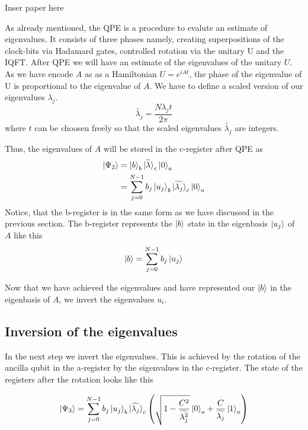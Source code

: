 Inser paper here

As already mentioned, the QPE is a procedure to evalute an estimate of eigenvalues. 
It consists of three phases namely, creating superpositions of the clock-bits via Hadamard gates, controlled rotation via the unitary U and the IQFT.
After QPE we will have an estimate of the eigenvalues of the unitary $U$. 
As we have encode $A$ as as a Hamiltonian $U = e^{iAt}$, the phase of the eigenvalue of U is proportional to the eigenvalue of $A$.
We have to define a scaled version of our eigenvalues $\lambda_j$.
\begin{equation}
\widetilde{\lambda_j} = \frac {N\lambda_jt}{2\pi}
\end{equation}
where $t$ can be choosen freely so that the scaled eigenvalues $\widetilde{\lambda_j}$ are integers.

Thus, the eigenvalues of $A$ will be stored in the c-register after QPE as
\begin{equation}
\begin{split}
\ket{\Psi_2} &= \ket{b}_b \ket{\widetilde{\lambda}}_c\ket{0}_a \\
& =\sum_{j=0}^{N-1} b_j \ket{u_j}_b \ket{\widetilde{\lambda_j}}_c \ket 0_a
\end{split}
\end{equation}
Notice, that the b-register is in the same form as we have discussed in the previous section. 
The b-register represents the $\ket b$ state in the eigenbasis $\ket{u_j}$ of $A$ like this
\begin{equation}
\ket{b} = \sum_{j=0}^{N-1} b_j\ket{u_j}
\end{equation}

Now that we have achieved the eigenvalues and have represented our $\ket{b}$ in the eigenbasis of $A$, we invert the eigenvalues $u_i$.


\subsection{Inversion of the eigenvalues}
In the next step we invert the eigenvalues.
This is achieved by the rotation of the ancilla qubit in the a-register by the eigenvalues in the c-register.
The state of the registers after the rotation looks like this

\begin{equation}
\ket{\Psi_3} = \sum_{j=0}^{N-1} b_j \ket{u_j}_b {\ket{\widetilde{\lambda_j}}}_c \left(\sqrt{1-\frac{C^2}{\widetilde{\lambda_j^2}}}\ket{0}_a + \frac{C}{\widetilde{\lambda_j}} \ket{1}_a\right)
\end{equation}


